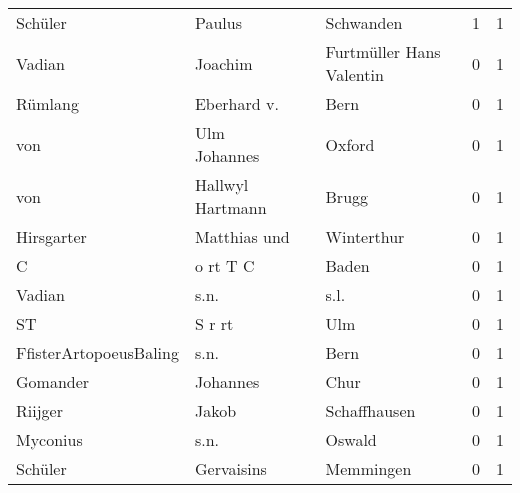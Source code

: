 \begin{center}
\begin{tiny}
\begin{longtabu}{llllrr}
                  Schüler &                             Paulus &             &                                   Schwanden &          1 &         1 \\
                   Vadian &                            Joachim &             &                    Furtmüller Hans Valentin &          0 &         1 \\
                  Rümlang &                        Eberhard v. &             &                                        Bern &          0 &         1 \\
                      von &                       Ulm Johannes &             &                                      Oxford &          0 &         1 \\
                      von &                   Hallwyl Hartmann &             &                                       Brugg &          0 &         1 \\
               Hirsgarter &                       Matthias und &             &                                  Winterthur &          0 &         1 \\
                        C &                           o rt T C &             &                                       Baden &          0 &         1 \\
                   Vadian &                               s.n. &             &                                        s.l. &          0 &         1 \\
                       ST &                             S r rt &             &                                         Ulm &          0 &         1 \\
   FfisterArtopoeusBaling &                               s.n. &             &                                        Bern &          0 &         1 \\
                 Gomander &                           Johannes &             &                                        Chur &          0 &         1 \\
                  Riijger &                              Jakob &             &                                Schaffhausen &          0 &         1 \\
                 Myconius &                               s.n. &             &                                      Oswald &          0 &         1 \\
                  Schüler &                         Gervaisins &             &                                   Memmingen &          0 &         1 \\

\end{longtabu}
\end{tiny}
\end{center}
